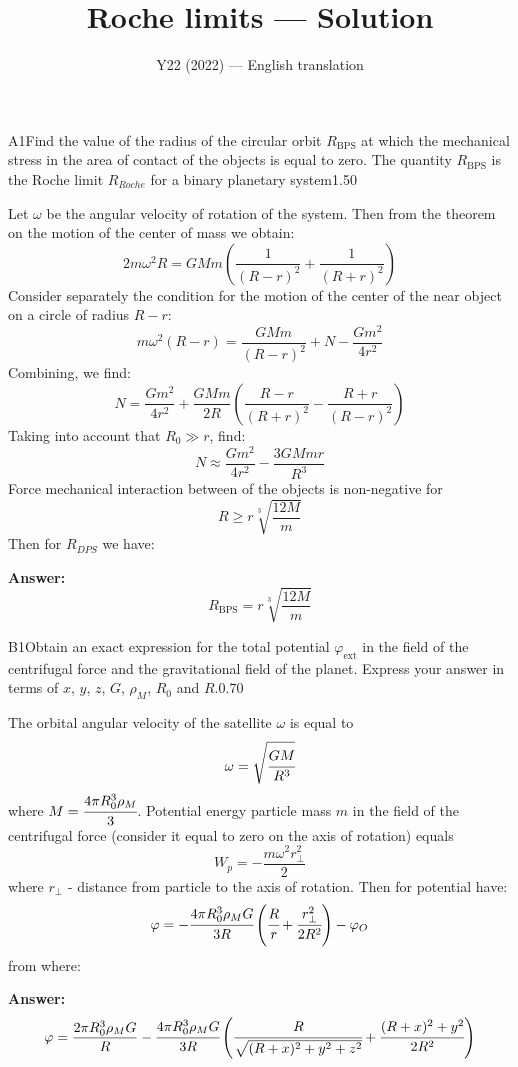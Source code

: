 \documentclass[11pt,a4paper]{article}
\title{\textbf{Roche limits --- Solution}}
\author{\normalsize Y22 (2022) — English translation}
\date{}
\begin{document}
\maketitle\vspace{-0.5em}
\begin{solcard}{A1}{Find the value of the radius of the circular orbit $R_\text{BPS}$ at which the mechanical stress in the area of contact of the objects is equal to zero. The quantity $R_\text{BPS}$ is the Roche limit $R_{Roche}$ for a binary planetary system}{1.50}

Let $\omega$ be the angular velocity of rotation of the system. Then from the theorem on the motion of the center of mass we obtain: $$2m\omega^2R=GMm\left(\displaystyle\frac{1}{(R-r)^2}+\displaystyle\frac{1}{(R+r)^2}\right) $$ Consider separately the condition for the motion of the center of the near object on a circle of radius $R-r$: $$m\omega^2(R-r)=\displaystyle\frac{GMm}{(R-r)^2}+N-\displaystyle\frac{Gm^2}{4r^2} $$ Combining, we find: $$N=\displaystyle\frac{Gm^2}{4r^2}+\displaystyle\frac{GMm}{2R}\left(\displaystyle\frac{R-r}{(R+r)^2}-\displaystyle\frac{R+r}{(R-r)^2}\right) $$ Taking into account that $R_0\gg{r}$, find: $$N\approx{\displaystyle\frac{Gm^2}{4r^2}-\displaystyle\frac{3GMmr}{R^3}} $$ Force mechanical interaction between of the objects is non-negative for $$R\geq{r\sqrt[3]{\displaystyle\frac{12M}{m}}} $$ Then for $R_{DPS}$ we have:

\par\smallskip\noindent\textbf{Answer:} $$R_\text{BPS}=r\sqrt[3]{\displaystyle\frac{12M}{m}} $$
\end{solcard}

\begin{solcard}{B1}{Obtain an exact expression for the total potential $\varphi_\text{ext}$ in the field of the centrifugal force and the gravitational field of the planet. Express your answer in terms of $x$, $y$, $z$, $G$, $\rho_M$, $R_0$ and $R$.}{0.70}

The orbital angular velocity of the satellite $\omega$ is equal to $$\omega=\sqrt{\cfrac{GM}{R^3}} $$ where $M=\cfrac{4\pi R^3_0\rho_M}{3}$. Potential energy particle mass $m$ in the field of the centrifugal force (consider it equal to zero on the axis of rotation) equals $$W_p=-\frac{m\omega^2r^2_{\perp}}{2} $$ where $r_{\perp}$ - distance from particle to the axis of rotation. Then for potential have: $$\varphi=-\cfrac{4\pi R^3_0\rho_MG}{3R}\left(\cfrac{R}{r}+\cfrac{r^2_\perp}{2R^2}\right)-\varphi_O $$ from where:

\par\smallskip\noindent\textbf{Answer:} $$\varphi=\frac{2\pi R^3_0\rho_MG}{R}-\cfrac{4\pi R^3_0\rho_MG}{3R}\left(\cfrac{R}{\sqrt{(R+x)^2+y^2+z^2}}+\cfrac{(R+x)^2+y^2}{2R^2}\right) $$
\end{solcard}
\end{document}
